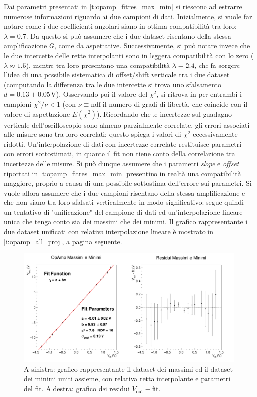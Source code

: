 \documentclass[a4paper,11pt]{article} %
\begin{document}
\noindent Dai parametri presentati in  \autoref{t:opamp_fitres_max_min} si riescono ad estrarre numerose informazioni
riguardo ai due campioni di dati. Inizialmente, si vuole far notare come i due coefficienti angolari siano in ottima
compatibilità tra loro: $\lambda=0.7$. Da questo si può assumere che i due dataset risentano della stessa amplificazione
$G$, come da aspettative. Successivamente, si può notare invece che le due intercette delle rette interpolanti sono in
leggera compatibilità con lo zero ($\lambda \approx 1.5$), mentre tra loro presentano una compatibilità $\lambda=2.4$,
che fa sorgere l'idea di una possibile sistematica di offset/shift verticale tra i due dataset (computando la differenza tra le
due intercette si trova uno sfalsamento $d=0.13 \pm 0.05 \,\si{\volt}$). Osservando poi il valore del $\chi^2$, si
ritrova in per entrambi i campioni $\chi^2/\nu<1$ (con $\nu\equiv\text{ndf}$ il numero di gradi di libertà, che coincide
con il valore di aspettazione $E(\chi^2)$). Ricordando che le incertezze sul guadagno verticale dell'oscilloscopio sono
almeno parzialmente correlate, gli errori associati alle misure sono tra loro correlati: questo spiega i valori di
$\chi^2$ eccessivamente ridotti. Un'interpolazione di dati con incertezze correlate restituisce parametri con errori
sottostimati, in quanto il fit non tiene conto della correlazione tra incertezze delle misure. Si può dunque assumere
che i parametri \textit{slope} e \textit{offset} riportati in \autoref{t:opamp_fitres_max_min} presentino in realtà una
compatibilità maggiore, proprio a causa di una possibile sottostima dell'errore sui parametri. Si vuole allora assumere
che i due campioni risentano della stessa amplificazione e che non siano tra loro sfalsati verticalmente in modo
significativo: segue quindi un tentativo di "unificazione" del campione di dati ed un'interpolazione lineare unica che
tenga conto sia dei massimi che dei minimi. Il grafico rappresentante i due dataset unificati con relativa
interpolazione lineare è mostrato in \autoref{i:opamp_all_proj}, a pagina seguente. 

\begin{figure}[H]
	\centering
	\includegraphics[width=15cm]{../Plots/Report_Plots/opamp_plot_all_projected.png}
	\caption{\small A sinistra: grafico rappresentante il dataset dei massimi ed il dataset dei minimi uniti assieme, 
	con relativa retta interpolante e parametri del fit. A destra: grafico dei residui $V_{\text{out}}-\text{fit}$.}
	\label{i:opamp_all_proj}
\end{figure}
\end{document}
